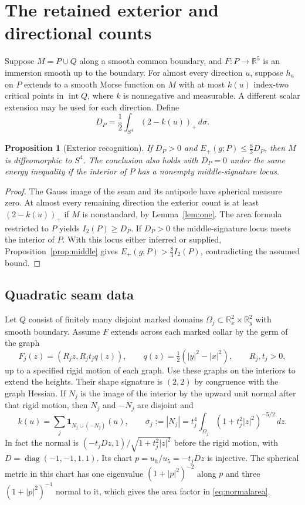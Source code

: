 \documentclass[11pt,letterpaper]{article}
\numberwithin{equation}{section}
\newtheorem{proposition}[theorem]{Proposition}
\newcommand{\R}{\mathbb R}
\begin{document}
\section{The retained exterior and directional counts}\label{sec:exterior}

Suppose \(M=P\cup Q\) along a smooth common boundary, and
\(F:P\to\R^5\) is an immersion smooth up to the boundary. For
almost every direction \(u\), suppose \(h_u\) on \(P\) extends
to a smooth Morse function on \(M\) with at most \(k(u)\)
index-two critical points in \(\operatorname{int}Q\), where
\(k\) is nonnegative and measurable. A different scalar
extension may be used for each direction. Define
\[
 D_P=\frac12\int_{S^4}(2-k(u))_+\,d\sigma .
\]
\begin{proposition}[Exterior recognition]\label{prop:exterior}
If \(D_P>0\) and \(E_+(g;P)\le \frac83 D_P\), then
\(M\) is diffeomorphic to \(S^4\). The conclusion also holds
with \(D_P=0\) under the same energy inequality if the interior
of \(P\) has a nonempty middle-signature locus.
\end{proposition}
\begin{proof}
The Gauss image of the seam and its antipode have spherical
measure zero. At almost every remaining direction the
exterior count is at least \((2-k(u))_+\) if \(M\) is
nonstandard, by Lemma~\ref{lem:one}. The area formula restricted
to \(P\) yields \(I_2(P)\ge D_P\). If \(D_P>0\) the middle-signature
locus meets the interior of \(P\). With this locus either
inferred or supplied, Proposition~\ref{prop:middle} gives
\(E_+(g;P)>\frac83 I_2(P)\), contradicting the assumed bound.
\end{proof}

\subsection{Quadratic seam data}

Let \(Q\) consist of finitely many disjoint marked domains
\(\Omega_j\subset\R^2_x\times\R^2_y\) with smooth boundary.
Assume \(F\) extends across each marked collar by the germ
of the graph
\[
 F_j(z)=(R_j z,R_j t_j q(z)),\qquad q(z)=\tfrac12(|y|^2-|x|^2),
 \qquad R_j,t_j>0,
\]
up to a specified rigid motion of each graph. Use these
graphs on the interiors to extend the heights. Their shape
signature is \((2,2)\) by congruence with the graph Hessian.
If \(N_j\) is the image of the interior by the upward
unit normal after that rigid motion, then \(N_j\) and
\(-N_j\) are disjoint and
\begin{equation}\label{eq:normalarea}
 k(u)=\sum_j \boldsymbol{1}_{N_j\cup(-N_j)}(u),\qquad
 \sigma_j:=|N_j|=t_j^4\int_{\Omega_j}(1+t_j^2|z|^2)^{-5/2}\,dz.
\end{equation}
In fact the normal is \((-t_jD z,1)/\sqrt{1+t_j^2|z|^2}\)
before the rigid motion, with \(D=\operatorname{diag}(-1,-1,1,1)\).
Its chart \(p=u_h/u_5=-t_jD z\) is injective. The spherical
metric in this chart has one eigenvalue \((1+|p|^2)^{-2}\)
along \(p\) and three \((1+|p|^2)^{-1}\) normal to it, which
gives the area factor in \eqref{eq:normalarea}.
\end{document}

